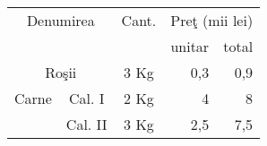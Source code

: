 \documentclass{article}
\begin{document}
\vspace{.5cm}

\begin{tabular}{| c | c | c | r | r | }
	\hline \hline
	\multicolumn{2}{|c|}{Denumirea}& Cant. &
	\multicolumn{2}{c|}{Preţ (mii lei)}\\
	\cline{4-5}
	\multicolumn{2}{|c|}{}&& unitar & total \\
	\hline \hline
	\multicolumn{2}{|c|}{Roşii}& 3 Kg & 0,3 & 0,9 \\
	\hline
	Carne & Cal. I & 2 Kg & 4 & 8 \\
	\cline{2-5}
	& Cal. II & 3 Kg & 2,5 & 7,5 \\
	\hline \hline
\end{tabular}
\end{document}
